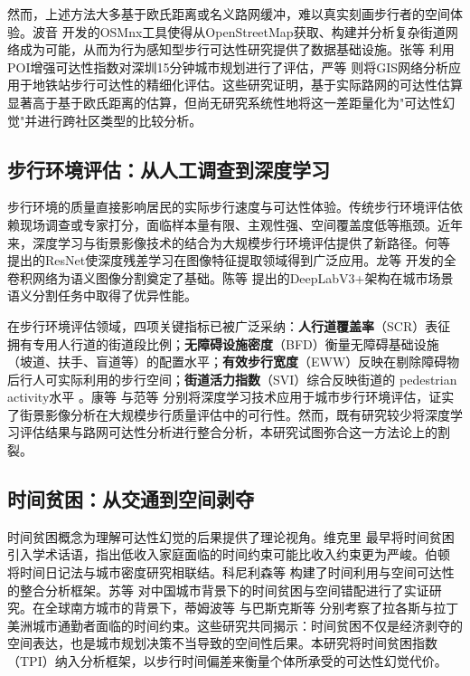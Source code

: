 \documentclass[10pt,conference]{IEEEtran}
\begin{document}
然而，上述方法大多基于欧氏距离或名义路网缓冲，难以真实刻画步行者的空间体验。波音 \cite{boeing2017osmnx} 开发的OSMnx工具使得从OpenStreetMap获取、构建并分析复杂街道网络成为可能，从而为行为感知型步行可达性研究提供了数据基础设施。张等 \cite{zhang2020poi} 利用POI增强可达性指数对深圳15分钟城市规划进行了评估，严等 \cite{yan2019gis} 则将GIS网络分析应用于地铁站步行可达性的精细化评估。这些研究证明，基于实际路网的可达性估算显著高于基于欧氏距离的估算，但尚无研究系统性地将这一差距量化为"可达性幻觉"并进行跨社区类型的比较分析。

\subsection{步行环境评估：从人工调查到深度学习}

步行环境的质量直接影响居民的实际步行速度与可达性体验。传统步行环境评估依赖现场调查或专家打分，面临样本量有限、主观性强、空间覆盖度低等瓶颈。近年来，深度学习与街景影像技术的结合为大规模步行环境评估提供了新路径。何等 \cite{he2016deep} 提出的ResNet使深度残差学习在图像特征提取领域得到广泛应用。龙等 \cite{long2015fully} 开发的全卷积网络为语义图像分割奠定了基础。陈等 \cite{chen2018encoder} 提出的DeepLabV3+架构在城市场景语义分割任务中取得了优异性能。

在步行环境评估领域，四项关键指标已被广泛采纳：\textbf{人行道覆盖率}（SCR）表征拥有专用人行道的街道段比例；\textbf{无障碍设施密度}（BFD）衡量无障碍基础设施（坡道、扶手、盲道等）的配置水平；\textbf{有效步行宽度}（EWW）反映在剔除障碍物后行人可实际利用的步行空间；\textbf{街道活力指数}（SVI）综合反映街道的 pedestrian activity水平 \cite{xu2021residential,zhu2021pedestrian,long2020deep}。康等 \cite{kang2023streetview} 与范等 \cite{fan2022walkability} 分别将深度学习技术应用于城市步行环境评估，证实了街景影像分析在大规模步行质量评估中的可行性。然而，既有研究较少将深度学习评估结果与路网可达性分析进行整合分析，本研究试图弥合这一方法论上的割裂。

\subsection{时间贫困：从交通到空间剥夺}

时间贫困概念为理解可达性幻觉的后果提供了理论视角。维克里 \cite{vickery1977time} 最早将时间贫困引入学术话语，指出低收入家庭面临的时间约束可能比收入约束更为严峻。伯顿 \cite{burton2000time} 将时间日记法与城市密度研究相联结。科尼利森等 \cite{cornelissen2018connecting} 构建了时间利用与空间可达性的整合分析框架。苏等 \cite{su2019time} 对中国城市背景下的时间贫困与空间错配进行了实证研究。在全球南方城市的背景下，蒂姆波等 \cite{timpo2021time} 与巴斯克斯等 \cite{vasquez2021time} 分别考察了拉各斯与拉丁美洲城市通勤者面临的时间约束。这些研究共同揭示：时间贫困不仅是经济剥夺的空间表达，也是城市规划决策不当导致的空间性后果。本研究将时间贫困指数（TPI）纳入分析框架，以步行时间偏差来衡量个体所承受的可达性幻觉代价。
\end{document}
